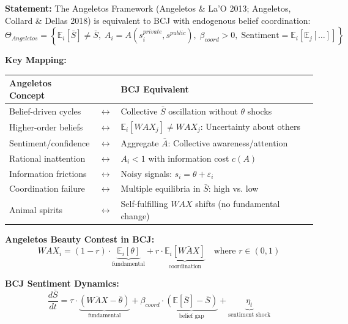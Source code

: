 \begin{tcolorbox}[colback=green!5!white, colframe=green!75!black,
    title=Theorem BCJ-T33: Angeletos Coordination \& Sentiment as Special Case]
\textbf{Statement:} The Angeletos Framework (Angeletos \& La'O 2013; Angeletos, Collard \& Dellas 2018) is equivalent to BCJ with endogenous belief coordination:
\begin{equation}
\Theta_{Angeletos} = \left\{\mathbb{E}_i[\bar{S}] \neq \bar{S}, \; A_i = A(s_i^{private}, s^{public}), \; \beta_{coord} > 0, \; \text{Sentiment} = \mathbb{E}_i[\mathbb{E}_j[\ldots]]\right\}
\end{equation}

\textbf{Key Mapping:}
\begin{center}
\begin{tabular}{lcl}
\toprule
\textbf{Angeletos Concept} & & \textbf{BCJ Equivalent} \\
\midrule
Belief-driven cycles & $\leftrightarrow$ & Collective $\bar{S}$ oscillation without $\theta$ shocks \\
Higher-order beliefs & $\leftrightarrow$ & $\mathbb{E}_i[WAX_j] \neq WAX_j$: Uncertainty about others \\
Sentiment/confidence & $\leftrightarrow$ & Aggregate $\bar{A}$: Collective awareness/attention \\
Rational inattention & $\leftrightarrow$ & $A_i < 1$ with information cost $c(A)$ \\
Information frictions & $\leftrightarrow$ & Noisy signals: $s_i = \theta + \varepsilon_i$ \\
Coordination failure & $\leftrightarrow$ & Multiple equilibria in $\bar{S}$: high vs. low \\
Animal spirits & $\leftrightarrow$ & Self-fulfilling $WAX$ shifts (no fundamental change) \\
\bottomrule
\end{tabular}
\end{center}

\textbf{Angeletos Beauty Contest in BCJ:}
\begin{equation}
WAX_i = (1-r) \cdot \underbrace{\mathbb{E}_i[\theta]}_{\text{fundamental}} + r \cdot \underbrace{\mathbb{E}_i[\bar{WAX}]}_{\text{coordination}} \quad \text{where } r \in (0,1)
\end{equation}

\textbf{BCJ Sentiment Dynamics:}
\begin{equation}
\frac{d\bar{S}}{dt} = \tau \cdot \underbrace{(\bar{WAX} - \bar{\theta})}_{\text{fundamental}} + \beta_{coord} \cdot \underbrace{(\mathbb{E}[\bar{S}] - \bar{S})}_{\text{belief gap}} + \underbrace{\eta_t}_{\text{sentiment shock}}
\end{equation}


\end{tcolorbox}
